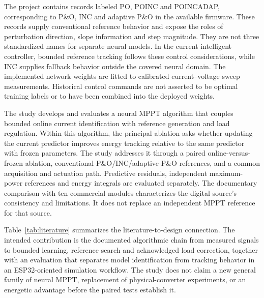 \documentclass[Acad.Energy.,researcharticle,9pt,twoside,oneauthor]{Definitions/jams_academia}
\begin{document}
The project contains records labeled PO, POINC and POINCADAP, corresponding to P\&O, INC and adaptive P\&O in the available firmware. These records supply conventional reference behavior and expose the roles of perturbation direction, slope information and step magnitude. They are not three standardized names for separate neural models. In the current intelligent controller, bounded reference tracking follows these control considerations, while INC supplies fallback behavior outside the covered neural domain. The implemented network weights are fitted to calibrated current--voltage sweep measurements. Historical control commands are not asserted to be optimal training labels or to have been combined into the deployed weights.

The study develops and evaluates a neural MPPT algorithm that couples bounded online current identification with reference generation and load regulation. Within this algorithm, the principal ablation asks whether updating the current predictor improves energy tracking relative to the same predictor with frozen parameters. The study addresses it through a paired online-versus-frozen ablation, conventional P\&O/INC/adaptive-P\&O references, and a common acquisition and actuation path. Predictive residuals, independent maximum-power references and energy integrals are evaluated separately. The documentary comparison with ten commercial modules characterizes the digital source's consistency and limitations. It does not replace an independent MPPT reference for that source.

Table~\ref{tab:literature} summarizes the literature-to-design connection. The intended contribution is the documented algorithmic chain from measured signals to bounded learning, reference search and acknowledged load correction, together with an evaluation that separates model identification from tracking behavior in an ESP32-oriented simulation workflow. The study does not claim a new general family of neural MPPT, replacement of physical-converter experiments, or an energetic advantage before the paired tests establish it.
\end{document}
